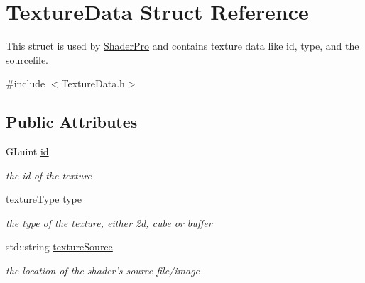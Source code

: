 \hypertarget{struct_texture_data}{\section{Texture\-Data Struct Reference}
\label{struct_texture_data}
}


This struct is used by \hyperlink{struct_shader_pro}{Shader\-Pro} and contains texture data like id, type, and the sourcefile.  




{\ttfamily \#include $<$Texture\-Data.\-h$>$}

\subsection*{Public Attributes}
\begin{DoxyCompactItemize}
\item 
\hypertarget{struct_texture_data_a030c2ca9c953c4243cfd5f131f03c1a6}{G\-Luint \hyperlink{struct_texture_data_a030c2ca9c953c4243cfd5f131f03c1a6}{id}}\label{struct_texture_data_a030c2ca9c953c4243cfd5f131f03c1a6}

\begin{DoxyCompactList}\small\item\em the id of the texture \end{DoxyCompactList}\item 
\hypertarget{struct_texture_data_a12ee96254495c48d589bf6398552568d}{\hyperlink{_texture_data_8h_a1c6a4ae96b6e19ca2b63765a595e49fa}{texture\-Type} \hyperlink{struct_texture_data_a12ee96254495c48d589bf6398552568d}{type}}\label{struct_texture_data_a12ee96254495c48d589bf6398552568d}

\begin{DoxyCompactList}\small\item\em the type of the texture, either 2d, cube or buffer \end{DoxyCompactList}\item 
\hypertarget{struct_texture_data_adca4b34fa82e3b3807b58ec58014901f}{std\-::string \hyperlink{struct_texture_data_adca4b34fa82e3b3807b58ec58014901f}{texture\-Source}}\label{struct_texture_data_adca4b34fa82e3b3807b58ec58014901f}

\begin{DoxyCompactList}\small\item\em the location of the shader's source file/image \end{DoxyCompactList}\end{DoxyCompactItemize}


